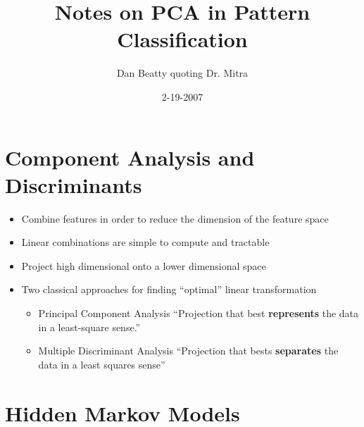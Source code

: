 \documentclass[11pt]{article}
\title{Notes on PCA in Pattern Classification}
\author{Dan Beatty quoting Dr. Mitra}
\date{2-19-2007}                                           %
\begin{document}
\maketitle

\section{Component Analysis and Discriminants}
\begin{itemize}
	\item Combine features in order to reduce the dimension of the feature space
	\item Linear combinations are simple to compute and tractable 
	\item Project high dimensional onto a lower dimensional space
	\item Two classical approaches for finding ``optimal'' linear transformation
	\begin{itemize}
		\item Principal Component Analysis ``Projection that best \textbf{represents} the data in a least-square sense.'' 
		\item Multiple Discriminant Analysis ``Projection that bests \textbf{separates} the data in a least squares sense''
	\end{itemize}
	
\end{itemize}

\section{Hidden Markov Models}
\end{document}
